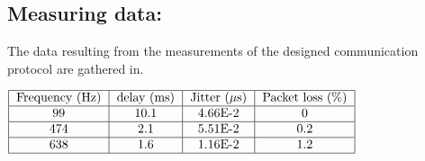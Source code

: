 \subsection*{Measuring data:}
The data resulting from the measurements of the designed communication protocol are
gathered in.
\begin{center}
  $\begin{tabular}{|c|c|c|c|c|}
    \hline
    \text{Frequency (Hz)} & \text{delay (ms)} & \text{Jitter ($\mu$s)} & \text{Packet loss (\%)}\\
    \hline
    99 & 10.1 & 4.66E-2 & 0 \\
    \hline
    474 & 2.1 & 5.51E-2 & 0.2 \\
    \hline
    638 & 1.6 & 1.16E-2 & 1.2 \\
    \hline
  \end{tabular}$
    \label{tab:udp_appendix}
\end{center}
% 	
% 	    
% 	    
% 	    
% 	    
% 	    

